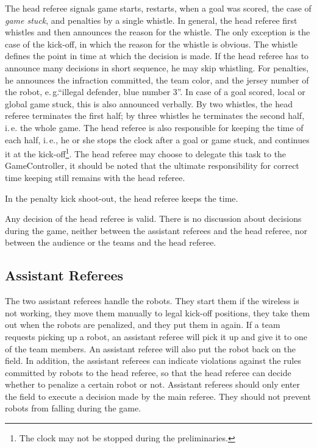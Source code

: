 \documentclass[12pt]{article}
\newcommand{\ie}{\mbox{i.\,e.}\xspace}
\newcommand{\eg}{\mbox{e.\,g.}\xspace}
\begin{document}
The head referee signals game starts, restarts, when a goal was scored, the case of \emph{game stuck}, and penalties by a single whistle. In general, the head referee first whistles and then announces the reason for the whistle. The only exception is the case of the kick-off, in which the reason for the whistle is obvious. The whistle defines the point in time at which the decision is made. If the head referee has to announce many decisions in short sequence, he may skip whistling. For penalties, he announces the infraction committed, the team color, and the jersey number of the robot, \eg ``illegal defender, blue number 3''. In case of a goal scored, local or global game stuck, this is also announced verbally. By two whistles, the head referee terminates the first half; by three whistles he terminates the second half, \ie the whole game. The head referee is also responsible for keeping the time of each half, \ie, he or she stops the clock after a goal or game stuck, and continues it at the kick-off\footnote{The clock may not be stopped during the preliminaries.}. The head referee may choose to delegate this task to the GameController, it should be noted that the ultimate responsibility for correct time keeping still remains with the head referee.

In the penalty kick shoot-out, the head referee keeps the time.

Any decision of the head referee is valid. There is no discussion about decisions during the game, neither between the assistant referees and the head referee, nor between the audience or the teams and the head referee.

\subsection{Assistant Referees}

The two assistant referees handle the robots. They start them if the wireless is not working, they move them manually to legal kick-off positions, they take them out when the robots are penalized, and they put them in again. If a team requests picking up a robot, an assistant referee will pick it up and give it to one of the team members. An assistant referee will also put the robot back on the field. In addition, the assistant referees can indicate violations against the rules committed by robots to the head referee, so that the head referee can decide whether to penalize a certain robot or not. Assistant referees should only enter the field to execute a decision made by the main referee. They should not prevent robots from falling during the game.
\end{document}
